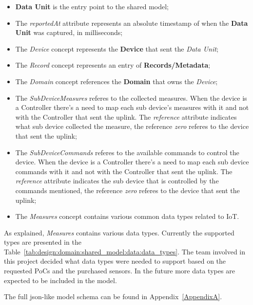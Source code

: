\begin{itemize}
   \item \textbf{Data Unit} is the entry point to the shared model;
   \item The \textit{reportedAt} attribute represents an absolute timestamp of when the \textbf{Data Unit} was captured, in milliseconds;
   \item The \textit{Device} concept represents the \textbf{Device} that sent the \textit{Data Unit};
   \item The \textit{Record} concept represents an entry of \textbf{Records/Metadata};
   \item The \textit{Domain} concept references the \textbf{Domain} that owns the \textit{Device};
   \item The \textit{SubDeviceMeasures} referes to the collected measures. When the device is a Controller there's a need to map each sub device's measures with it and not with the Controller that sent the uplink. The \textit{reference} attribute indicates what sub device collected the measure, the reference \textit{zero} referes to the device that sent the uplink;
   \item The \textit{SubDeviceCommands} referes to the available commands to control the device. When the device is a Controller there's a need to map each sub device commands with it and not with the Controller that sent the uplink. The \textit{reference} attribute indicates the sub device that is controlled by the commands mentioned, the reference \textit{zero} referes to the device that sent the uplink;
   \item The \textit{Measures} concept contains various common data types related to \gls{IoT}.
\end{itemize}

As explained, \textit{Measures} contains various data types. Currently the supported types are presented in the Table~\ref{tab:design:domain:shared_model:data:data_types}. The team involved in this project decided what data types were needed to support based on the requested \gls{PoC}s and the purchased sensors. In the future more data types are expected to be included in the model.

The full json-like model schema can be found in Appendix~\ref{AppendixA}.

